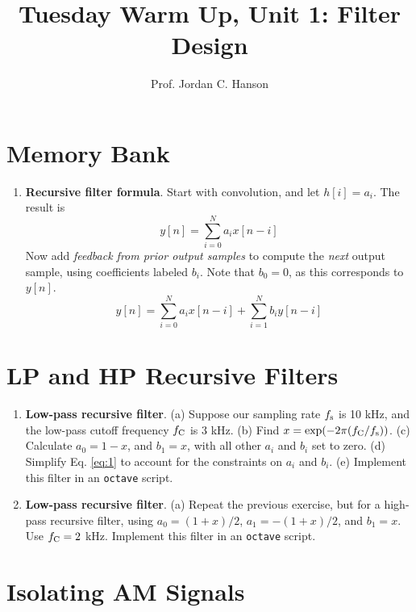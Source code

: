 \documentclass{article}
\begin{document}
\twocolumn

\title{Tuesday Warm Up, Unit 1: Filter Design}
\author{Prof. Jordan C. Hanson}
\maketitle

\section{Memory Bank}

\begin{enumerate}
\item \textbf{Recursive filter formula}.  Start with convolution, and let $h[i] = a_i$.  The result is
\begin{equation}
y[n] = \sum_{i=0}^N a_i x[n-i]
\end{equation}
Now add \textit{feedback from prior output samples} to compute the \textit{next} output sample, using coefficients labeled $b_i$.  Note that $b_0 = 0$, as this corresponds to $y[n]$.
\begin{equation}
y[n] = \sum_{i=0}^N a_i x[n-i] + \sum_{i=1}^N b_i y[n-i] \label{eq:1}
\end{equation}
\end{enumerate}

\section{LP and HP Recursive Filters}

\begin{enumerate}
\item \textbf{Low-pass recursive filter}.  (a) Suppose our sampling rate $f_{\rm s}$ is 10 kHz, and the low-pass cutoff frequency $f_{\rm C}$ is 3 kHz.  (b) Find $x = \exp(-2\pi (f_{\rm C}/f_{\rm s}))$. (c) Calculate $a_0 = 1-x$, and $b_1 = x$, with all other $a_i$ and $b_i$ set to zero. (d) Simplify Eq. \ref{eq:1} to account for the constraints on $a_i$ and $b_i$.  (e) Implement this filter in an \verb+octave+ script.
\item \textbf{Low-pass recursive filter}.  (a) Repeat the previous exercise, but for a high-pass recursive filter, using $a_0 = (1+x)/2$, $a_1 = -(1+x)/2$, and $b_1 = x$.  Use $f_{\rm C} = 2$ kHz.  Implement this filter in an \verb+octave+ script.
\end{enumerate}

\section{Isolating AM Signals}
\end{document}
